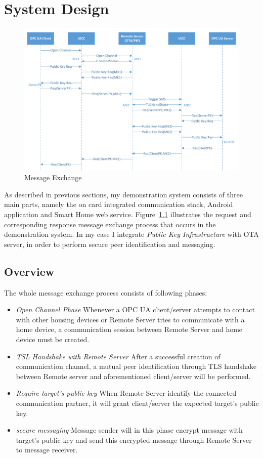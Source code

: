 \chapter{System Design}

\begin{figure}[!htbp]
	\centering
	\includegraphics[width=1\textwidth]{whole-structure}
		\caption{Message Exchange}
	\label{fig:whole-structure}
\end{figure}

As described in previous sections, my demonstration system consists of three main parts, namely the on card integrated communication stack, Android application and Smart Home web service. Figure~\ref{fig:whole-structure} illustrates the request and corresponding response message exchange process that occurs in the demonstration system. In my case I integrate \emph{Public Key Infrastructure} with OTA server, in order to perform secure peer identification and messaging.
\section{Overview}
The whole message exchange process consists of following phases:
\begin{itemize}
\item \emph{Open Channel Phase} Whenever a OPC UA client/server attempts to contact with other housing devices or Remote Server tries to communicate with a home device, a communication session between Remote Server and home device must be created.
\item \emph{TSL Handshake with Remote Server} After a successful creation of communication channel, a mutual peer identification through TLS handshake between Remote server and aforementioned client/server will be performed.
\item \emph{Require target's public key} When Remote Server identify the connected communication partner, it will grant client/server the expected target's public key. 
\item \emph{secure messaging} Message sender will in this phase encrypt message with target's public key and send this encrypted message through Remote Server to message receiver. 
\end{itemize}

